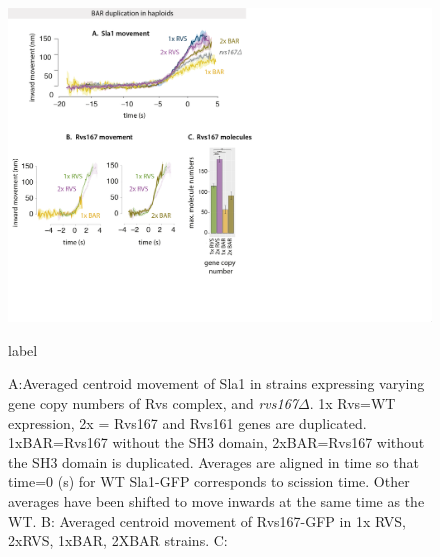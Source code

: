 		\begin{figure}
		\centering
		\includegraphics[width=23cm,height=23 cm,keepaspectratio]{figures/results_final/scaffolding_overlaid2}
		\caption [Progression of invagination with increasing BAR recruitment]
		{A:Averaged centroid movement of Sla1 in strains expressing varying gene copy numbers of Rvs complex, and \textit{rvs167$\Delta$}. 1x Rvs=WT expression, 2x = Rvs167 and Rvs161 genes are duplicated. 1xBAR=Rvs167 without the SH3 domain, 2xBAR=Rvs167 without the SH3 domain is duplicated. Averages are aligned in time so that time=0 (s) for WT Sla1-GFP corresponds to scission time. Other averages have been shifted to move inwards at the same time as the WT.
		B: Averaged centroid movement of Rvs167-GFP in 1x RVS, 2xRVS, 1xBAR, 2XBAR strains.
		C:  }
		label
		\end{figure}


